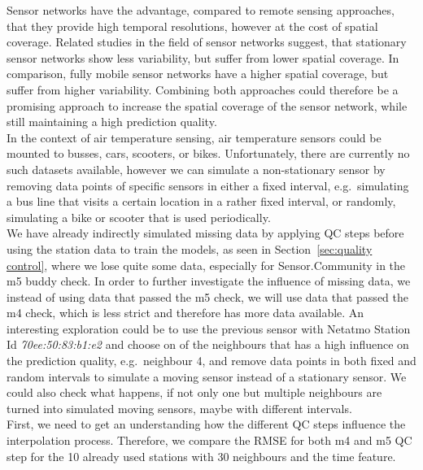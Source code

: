 
Sensor networks have the advantage, compared to remote sensing approaches, that they provide high temporal resolutions, however at the cost of spatial coverage. Related studies in the field of sensor networks suggest, %
that stationary sensor networks show less variability, but suffer from lower spatial coverage. In comparison, fully mobile sensor networks have a higher spatial coverage, but suffer from higher variability. Combining both approaches could therefore be a promising approach to increase the spatial coverage of the sensor network, while still maintaining a high prediction quality.\\
In the context of air temperature sensing, air temperature sensors could be mounted to busses, cars, scooters, or bikes. Unfortunately, there are currently no such datasets available, however we can simulate a non-stationary sensor by removing data points of specific sensors in either a fixed interval, e.g.\ simulating a bus line that visits a certain location in a rather fixed interval, or randomly, simulating a bike or scooter that is used periodically.\\
We have already indirectly simulated missing data by applying QC steps before using the station data to train the models, as seen in Section~\ref{sec:quality control}, where we lose quite some data, especially for Sensor.Community in the m5 buddy check. In order to further investigate the influence of missing data, we instead of using data that passed the m5 check, we will use data that passed the m4 check, which is less strict and therefore has more data available. An interesting exploration could be to use the previous sensor with Netatmo Station Id \textit{70ee:50:83:b1:e2} and choose on of the neighbours that has a high influence on the prediction quality, e.g.\ neighbour 4, and remove data points in both fixed and random intervals to simulate a moving sensor instead of a stationary sensor. We could also check what happens, if not only one but multiple neighbours are turned into simulated moving sensors, maybe with different intervals.\\
First, we need to get an understanding how the different QC steps influence the interpolation process. Therefore, we compare the RMSE for both m4 and m5 QC step for the 10 already used stations with 30 neighbours and the time feature.

